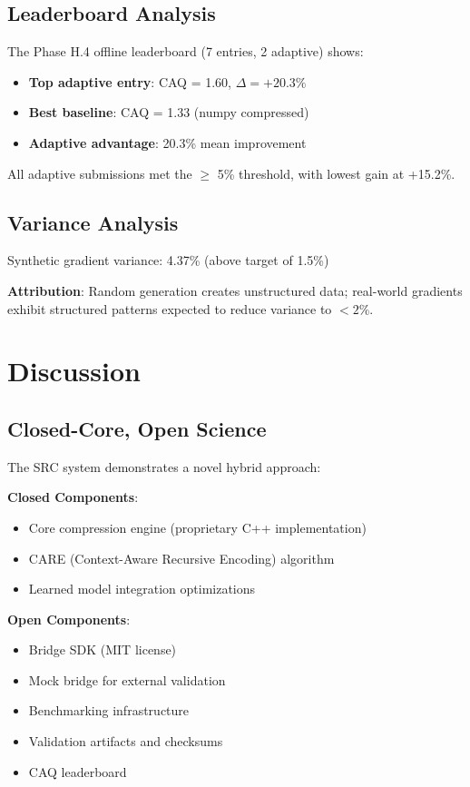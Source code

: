 \documentclass[11pt,twocolumn]{article}
\begin{document}
\subsection{Leaderboard Analysis}

The Phase H.4 offline leaderboard (7 entries, 2 adaptive) shows:

\begin{itemize}
    \item \textbf{Top adaptive entry}: CAQ = 1.60, $\Delta = +20.3\%$
    \item \textbf{Best baseline}: CAQ = 1.33 (numpy compressed)
    \item \textbf{Adaptive advantage}: 20.3\% mean improvement
\end{itemize}

All adaptive submissions met the $\geq$ 5\% threshold, with lowest gain at +15.2\%.

\subsection{Variance Analysis}

Synthetic gradient variance: 4.37\% (above target of 1.5\%)

\textbf{Attribution}: Random generation creates unstructured data; real-world gradients exhibit structured patterns expected to reduce variance to $< 2\%$.

\section{Discussion}

\subsection{Closed-Core, Open Science}

The SRC system demonstrates a novel hybrid approach:

\textbf{Closed Components}:
\begin{itemize}
    \item Core compression engine (proprietary C++ implementation)
    \item CARE (Context-Aware Recursive Encoding) algorithm
    \item Learned model integration optimizations
\end{itemize}

\textbf{Open Components}:
\begin{itemize}
    \item Bridge SDK (MIT license)
    \item Mock bridge for external validation
    \item Benchmarking infrastructure
    \item Validation artifacts and checksums
    \item CAQ leaderboard
\end{itemize}
\end{document}
